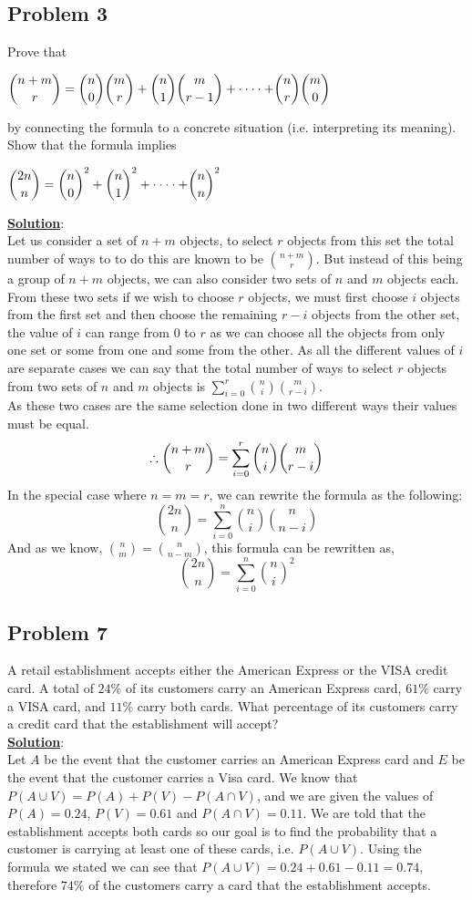 \documentclass[11pt,letter paper]{report}
\begin{document}
\subsection*{Problem 3}
Prove that
\begin{center}
$\dbinom{n+m}{r}=\dbinom{n}{0}\dbinom{m}{r}+\dbinom{n}{1}\dbinom{m}{r-1}+\cdot\cdot\cdot\cdot+\dbinom{n}{r}\dbinom{m}{0}$
\end{center}
by connecting the formula to a concrete situation (i.e. interpreting its meaning). Show that the formula implies
\begin{center}
$\dbinom{2n}{n}=\dbinom{n}{0}^2+\dbinom{n}{1}^2+\cdot\cdot\cdot\cdot+\dbinom{n}{n}^2$
\end{center}
{\bf \underline{Solution}}:\\
Let us consider a set of $n+m$ objects, to select $r$ objects from this set the total number of ways to to do this are known to be $\binom{n+m}{r}$. But instead of this being a group of $n+m$ objects, we can also consider two sets of $n$ and $m$ objects each. From these two sets if we wish to choose $r$ objects, we must first choose $i$ objects from the first set and then choose the remaining $r-i$ objects from the other set, the value of $i$ can range from $0$ to $r$ as we can choose all the objects from only one set or some from one and some from the other. As all the different values of $i$ are separate cases we can say that the total number of ways to select $r$ objects from two sets of $n$ and $m$ objects is $\sum^r_{i=0}\binom{n}{i}\binom{m}{r-i}$.\\
As these two cases are the same selection done in two different ways their values must be equal.$$\therefore\dbinom{n+m}{r}=\sum^r_{i=0}\binom{n}{i}\binom{m}{r-i}$$
In the special case where $n=m=r$, we can rewrite the formula as the following:$$\binom{2n}{n}=\sum^n_{i=0}\binom{n}{i}\binom{n}{n-i}$$
And as we know, $\binom{n}{m}=\binom{n}{n-m}$, this formula can be rewritten as, $$\binom{2n}{n}=\sum^n_{i=0}\binom{n}{i}^2$$

\subsection*{Problem 7}
A retail establishment accepts either the American Express or the VISA credit card. A total of $24\%$ of its customers carry an American Express card, $61\%$ carry a VISA card, and $11\%$ carry both cards. What percentage of its customers carry a credit card that the establishment will accept?\\[0.1cm]
{\bf \underline{Solution}}:\\
Let $A$ be the event that the customer carries an American Express card and $E$ be the event that the customer carries a Visa card. We know that $P(A\cup V)=P(A)+P(V)-P(A\cap V)$, and we are given the values of $P(A)=0.24$, $P(V)=0.61$ and $P(A\cap V)=0.11$. We are told that the establishment accepts both cards so our goal is to find the probability that a customer is carrying at least one of these cards, i.e. $P(A\cup V)$. Using the formula we stated we can see that $P(A\cup V)=0.24+0.61-0.11=0.74$, therefore \underline{\underline{$74\%$}} of the customers carry a card that the establishment accepts. 
\end{document}
